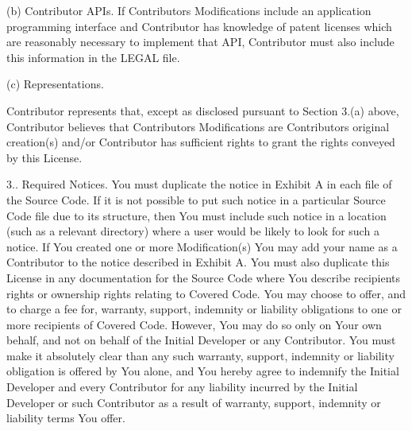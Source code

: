 \begin{DoxyEnumerate}
(b) Contributor A\+P\+Is. If Contributor\textquotesingle{}s Modifications include an application programming interface and Contributor has knowledge of patent licenses which are reasonably necessary to implement that A\+P\+I, Contributor must also include this information in the L\+E\+G\+A\+L file. \begin{DoxyVerb} (c)    Representations.
\end{DoxyVerb}
 Contributor represents that, except as disclosed pursuant to Section 3.(a) above, Contributor believes that Contributor\textquotesingle{}s Modifications are Contributor\textquotesingle{}s original creation(s) and/or Contributor has sufficient rights to grant the rights conveyed by this License.

3.. Required Notices. You must duplicate the notice in Exhibit A in each file of the Source Code. If it is not possible to put such notice in a particular Source Code file due to its structure, then You must include such notice in a location (such as a relevant directory) where a user would be likely to look for such a notice. If You created one or more Modification(s) You may add your name as a Contributor to the notice described in Exhibit A. You must also duplicate this License in any documentation for the Source Code where You describe recipients\textquotesingle{} rights or ownership rights relating to Covered Code. You may choose to offer, and to charge a fee for, warranty, support, indemnity or liability obligations to one or more recipients of Covered Code. However, You may do so only on Your own behalf, and not on behalf of the Initial Developer or any Contributor. You must make it absolutely clear than any such warranty, support, indemnity or liability obligation is offered by You alone, and You hereby agree to indemnify the Initial Developer and every Contributor for any liability incurred by the Initial Developer or such Contributor as a result of warranty, support, indemnity or liability terms You offer.


\end{DoxyEnumerate}
